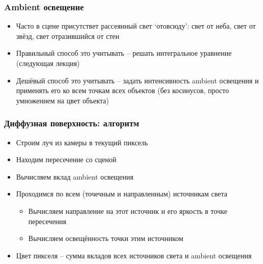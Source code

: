 \documentclass[10pt,handout]{beamer}
\begin{document}
\begin{frame}[fragile]
\begin{center}
\end{center}
\end{frame}

\begin{frame}[fragile]
\frametitle{Ambient освещение}
\begin{itemize}
\item Часто в сцене присутствет рассеянный свет `отовсюду': свет от неба, свет от звёзд, свет отразившийся от стен
\pause
\item Правильный способ это учитывать -- решать интегральное уравнение (следующая лекция)
\pause
\item Дешёвый способ это учитывать -- задать интенсивность ambient освещения и применять его ко всем точкам всех объектов (без косинусов, просто умножением на цвет объекта)
\end{itemize}
\end{frame}

\begin{frame}[fragile]
\frametitle{Диффузная поверхность: алгоритм}
\begin{itemize}
\item Строим луч из камеры в текущий пиксель
\pause
\item Находим пересечение со сценой
\pause
\item Вычисляем вклад ambient освещения
\pause
\item Проходимся по всем (точечным и направленным) источникам света
\pause
\begin{itemize}
\item Вычисляем направление на этот источник и его яркость в точке пересечения
\pause
\item Вычисляем освещённость точки этим источником
\end{itemize}
\pause
\item Цвет пикселя -- сумма вкладов всех источников света и ambient освещения
\end{itemize}
\end{frame}
\end{document}
